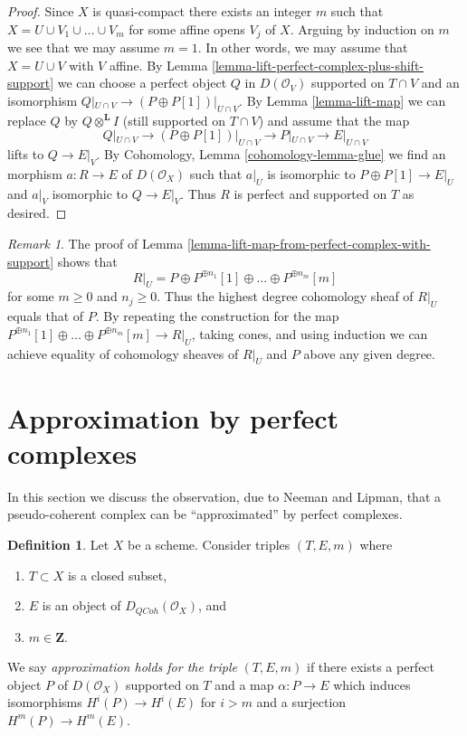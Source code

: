 \documentclass{stacks-project}
\theoremstyle{plain}
\theoremstyle{definition}
\newtheorem{definition}[subsection]{Definition}
\theoremstyle{remark}
\newtheorem{remark}[subsection]{Remark}
\numberwithin{equation}{subsection}
\def\QCoh{\mathit{QCoh}}
\begin{document}
\begin{proof}
Since $X$ is quasi-compact there exists an integer $m$ such that
$X = U \cup V_1 \cup \ldots \cup V_m$ for some affine opens $V_j$ of $X$.
Arguing by induction on $m$ we see that we may assume $m = 1$. In other
words, we may assume that $X = U \cup V$ with $V$ affine. By
Lemma \ref{lemma-lift-perfect-complex-plus-shift-support}
we can choose a perfect object $Q$ in $D(\mathcal{O}_V)$
supported on $T \cap V$ and an isomorphism
$Q|_{U \cap V} \to (P \oplus P[1])|_{U \cap V}$.
By Lemma \ref{lemma-lift-map} we can replace $Q$ by
$Q \otimes^\mathbf{L} I$ (still supported on $T \cap V$)
and assume that the map
$$
Q|_{U \cap V} \to (P \oplus P[1])|_{U \cap V}
\longrightarrow P|_{U \cap V}
\longrightarrow
E|_{U \cap V}
$$
lifts to $Q \to E|_V$. By
Cohomology, Lemma \ref{cohomology-lemma-glue}
we find an morphism $a : R \to E$ of $D(\mathcal{O}_X)$
such that $a|_U$ is isomorphic to $P \oplus P[1] \to E|_U$
and $a|_V$ isomorphic to $Q \to E|_V$.
Thus $R$ is perfect and supported on $T$ as desired.
\end{proof}

\begin{remark}
\label{remark-addendum}
The proof of Lemma \ref{lemma-lift-map-from-perfect-complex-with-support}
shows that
$$
R|_U = P \oplus P^{\oplus n_1}[1] \oplus \ldots \oplus P^{\oplus n_m}[m]
$$
for some $m \geq 0$ and $n_j \geq 0$. Thus the highest degree cohomology sheaf
of $R|_U$ equals that of $P$. By repeating the construction for the map
$P^{\oplus n_1}[1] \oplus \ldots \oplus P^{\oplus n_m}[m] \to R|_U$, taking
cones, and using induction we can achieve equality of cohomology sheaves
of $R|_U$ and $P$ above any given degree.
\end{remark}



\section{Approximation by perfect complexes}
\label{section-approximation}

\noindent
In this section we discuss the observation, due to Neeman and Lipman,
that a pseudo-coherent complex can be ``approximated'' by perfect complexes.

\begin{definition}
\label{definition-approximation-holds}
Let $X$ be a scheme. Consider triples $(T, E, m)$ where
\begin{enumerate}
\item $T \subset X$ is a closed subset,
\item $E$ is an object of $D_\QCoh(\mathcal{O}_X)$, and
\item $m \in \mathbf{Z}$.
\end{enumerate}
We say {\it approximation holds for the triple} $(T, E, m)$ if
there exists a perfect object $P$ of $D(\mathcal{O}_X)$ supported on $T$
and a map $\alpha : P \to E$ which induces isomorphisms $H^i(P) \to H^i(E)$
for $i > m$ and a surjection $H^m(P) \to H^m(E)$.
\end{definition}
\end{document}
